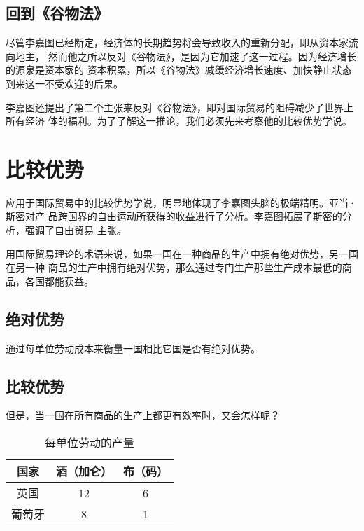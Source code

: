 \subsection{回到《谷物法》}

尽管李嘉图已经断定，经济体的长期趋势将会导致收入的重新分配，即从资本家流向地主，
然而他之所以反对《谷物法》，是因为它加速了这一过程。因为经济增长的源泉是资本家的
资本积累，所以《谷物法》减缓经济增长速度、加快静止状态到来这一不受欢迎的后果。

李嘉图还提出了第二个主张来反对《谷物法》，即对国际贸易的阻碍减少了世界上所有经济
体的福利。为了了解这一推论，我们必须先来考察他的比较优势学说。

\section{比较优势}

应用于国际贸易中的比较优势学说，明显地体现了李嘉图头脑的极端精明。亚当·斯密对产
品跨国界的自由运动所获得的收益进行了分析。李嘉图拓展了斯密的分析，强调了自由贸易
主张。

用国际贸易理论的术语来说，如果一国在一种商品的生产中拥有绝对优势，另一国在另一种
商品的生产中拥有绝对优势，那么通过专门生产那些生产成本最低的商品，各国都能获益。

\subsection{绝对优势}

通过每单位劳动成本来衡量一国相比它国是否有绝对优势。

\subsection{比较优势}

但是，当一国在所有商品的生产上都更有效率时，又会怎样呢？

\begin{table}[htbp]
  \centering
  \caption{每单位劳动的产量}
  \label{tab:bijiaoyoushi}
    \begin{tabular}{@{}ccc@{}}
      \toprule
      \textbf{国家} & \textbf{酒（加仑）} & \textbf{布（码）}   \\ \midrule
      英国 & 12 & 6   \\
      葡萄牙& 8 &  1  \\ \bottomrule
    \end{tabular}%
\end{table}

